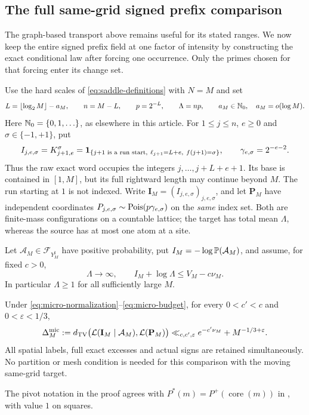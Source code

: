 \subsection{The full same-grid signed prefix comparison}
\label{sec:micro-run-comparison}
The graph-based transport above remains useful for its stated ranges.
We now keep the entire signed prefix field at one factor of intensity by
constructing the exact conditional law after forcing one occurrence.
Only the primes chosen for that forcing enter its change set.

Use the hard scales of \eqref{eq:saddle-definitions} with $N=M$ and set
\begin{equation}\label{eq:micro-normalization}
 L=\lfloor\log_2M\rfloor-a_M,\qquad n=M-L,\qquad p=2^{-L},\qquad
 \Lambda=np,\qquad a_M\in\mathbb N_0,\quad a_M=o(\log M).
\end{equation}
Here $\mathbb N_0=\{0,1,\ldots\}$, as elsewhere in this article.
For $1\le j\le n$, $e\ge0$ and $\sigma\in\{-1,+1\}$, put
\begin{equation}\label{eq:micro-indicators}
 I_{j,e,\sigma}=K^\sigma_{j+1,e}
 =\mathbf 1_{\{j+1\text{ is a run start},\ \ell_{j+1}=L+e,\ f(j+1)=\sigma\}},
 \qquad \gamma_{e,\sigma}=2^{-e-2}.
\end{equation}
Thus the raw exact word occupies the integers $j,\ldots,j+L+e+1$.
Its base is contained in $[1,M]$, but its full rightward length may
continue beyond $M$. The run starting at $1$ is not indexed.
Write $\mathbf I_M=(I_{j,e,\sigma})_{j,e,\sigma}$, and let
$\mathbf P_M$ have independent coordinates
$P_{j,e,\sigma}\sim\operatorname{Pois}(p\gamma_{e,\sigma})$ on the \emph{same} index set.
Both are finite-mass configurations on a countable lattice; the target
has total mean $\Lambda$, whereas the source has at most one atom at a site.

Let $\mathcal A_M\in\mathcal F_{Y_M^\sharp}$ have positive probability,
put $I_M=-\log\mathbb P(\mathcal A_M)$, and assume, for fixed $c>0$,
\begin{equation}\label{eq:micro-budget}
 \Lambda\to\infty,\qquad I_M+\log\Lambda\le V_M-c\nu_M.
\end{equation}
In particular $\Lambda\ge1$ for all sufficiently large $M$.

\begin{theorem}
\label{thm:micro-run-tv}\label{C-MICRO-RUN-TV}
Under \eqref{eq:micro-normalization}--\eqref{eq:micro-budget}, for every
$0<c'<c$ and $0<\varepsilon<1/3$,
\begin{equation}\label{eq:micro-tv}
 \Delta_M^{\rm mic}:=
 d_{\mathrm{TV}}\bigl(\mathcal L(\mathbf I_M\mid\mathcal A_M),\mathcal L(\mathbf P_M)\bigr)
 \ll_{c,c',\varepsilon} e^{-c'\nu_M}+M^{-1/3+\varepsilon}.
\end{equation}
All spatial labels, full exact excesses and actual signs are retained
simultaneously. No partition or mesh condition is needed for this
comparison with the moving same-grid target.
\end{theorem}
The pivot notation in the proof agrees with
$P^*(m)=P^+(\operatorname{core}(m))$ in
\cite[eq.~(5)]{deLaBretecheWangXu2026}, with value $1$ on squares.

